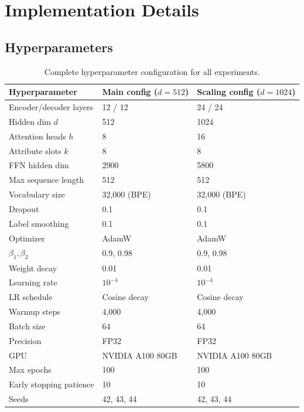 \documentclass[conference]{IEEEtran}
\begin{document}
\section{Implementation Details}
\label{app:impl}

\subsection{Hyperparameters}

\begin{table}[tb]
\centering
\caption{Complete hyperparameter configuration for all experiments.}
\label{tab:hparams}
\begin{tabular}{lll}
\toprule
\textbf{Hyperparameter} & \textbf{Main config ($d{=}512$)} & \textbf{Scaling config ($d{=}1024$)} \\
\midrule
Encoder/decoder layers & 12 / 12 & 24 / 24 \\
Hidden dim $d$ & 512 & 1024 \\
Attention heads $h$ & 8 & 16 \\
Attribute slots $k$ & 8 & 8 \\
FFN hidden dim & 2900 & 5800 \\
Max sequence length & 512 & 512 \\
Vocabulary size & 32,000 (BPE) & 32,000 (BPE) \\
Dropout & 0.1 & 0.1 \\
Label smoothing & 0.1 & 0.1 \\
Optimizer & AdamW & AdamW \\
$\beta_1, \beta_2$ & 0.9, 0.98 & 0.9, 0.98 \\
Weight decay & 0.01 & 0.01 \\
Learning rate & $10^{-4}$ & $10^{-4}$ \\
LR schedule & Cosine decay & Cosine decay \\
Warmup steps & 4,000 & 4,000 \\
Batch size & 64 & 64 \\
Precision & FP32 & FP32 \\
GPU & NVIDIA A100 80GB & NVIDIA A100 80GB \\
Max epochs & 100 & 100 \\
Early stopping patience & 10 & 10 \\
Seeds & 42, 43, 44 & 42, 43, 44 \\
\bottomrule
\end{tabular}%
\end{table}
\end{document}

